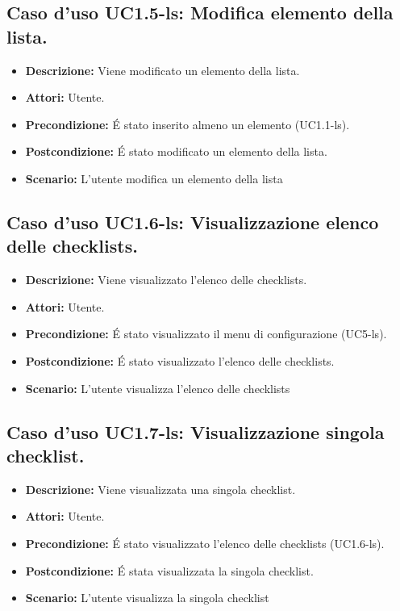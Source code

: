 \subsection{Caso d'uso UC1.5-ls: Modifica elemento della lista.}
\begin{itemize}
\item[]\textbf{Descrizione:} Viene modificato un elemento della lista.
\item[]\textbf{Attori:} Utente. 
\item[]\textbf{Precondizione:} \'E stato inserito almeno un elemento (UC1.1-ls). 
\item[]\textbf{Postcondizione:} \'E stato modificato un elemento della lista. 
\item[]\textbf{Scenario:}
L'utente modifica un elemento della lista 
\end{itemize}

\subsection{Caso d'uso UC1.6-ls: Visualizzazione elenco delle checklists.}
\begin{itemize}
\item[]\textbf{Descrizione:} Viene visualizzato l'elenco delle checklists.
\item[]\textbf{Attori:} Utente. 
\item[]\textbf{Precondizione:} \'E stato visualizzato il menu di configurazione (UC5-ls). 
\item[]\textbf{Postcondizione:} \'E stato visualizzato l'elenco delle checklists. 
\item[]\textbf{Scenario:}
L'utente visualizza l'elenco delle checklists 
\end{itemize}

\subsection{Caso d'uso UC1.7-ls: Visualizzazione singola checklist.}
\begin{itemize}
\item[]\textbf{Descrizione:} Viene visualizzata una singola checklist.
\item[]\textbf{Attori:} Utente. 
\item[]\textbf{Precondizione:} \'E stato visualizzato l'elenco delle checklists (UC1.6-ls). 
\item[]\textbf{Postcondizione:} \'E stata visualizzata la singola checklist. 
\item[]\textbf{Scenario:}
L'utente visualizza la singola checklist 
\end{itemize}


